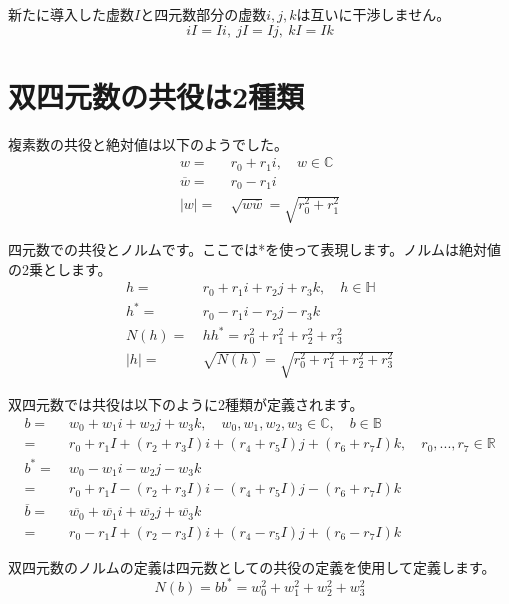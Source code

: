 \documentclass[a4paper,12pt,notitlepage]{jsreport}
\begin{document}
新たに導入した虚数$I$と四元数部分の虚数$i, j, k$は互いに干渉しません。
\begin{equation}
iI=Ii,~jI=Ij,~kI=Ik
\end{equation}

\section{双四元数の共役は2種類}

複素数の共役と絶対値は以下のようでした。
\begin{equation}
\begin{split}
w=~&r_0+r_1i,\quad w\in\mathbb{C}\\
\overline{w}=~&r_0-r_1i\\
|w|=~&\sqrt{w\overline{w}}=\sqrt{r_0^2+r_1^2}
\end{split}
\end{equation}

四元数での共役とノルムです。ここでは*を使って表現します。ノルムは絶対値の2乗とします。
\begin{equation}
\begin{split}
h=~&r_0+r_1i+r_2j+r_3k,\quad h\in\mathbb{H}\\
h^*=~&r_0-r_1i-r_2j-r_3k\\
N(h)=~&hh^*=r_0^2+r_1^2+r_2^2+r_3^2\\
|h|=~&\sqrt{N(h)}=\sqrt{r_0^2+r_1^2+r_2^2+r_3^2}
\end{split}
\end{equation}

双四元数では共役は以下のように2種類が定義されます。
\begin{equation}
\begin{split}
b=~&w_0+w_1i+w_2j+w_3k,\quad w_0,w_1,w_2,w_3\in\mathbb{C},\quad b\in\mathbb{B}\\
=~&r_0+r_1I+(r_2+r_3I)i+(r_4+r_5I)j+(r_6+r_7I)k,\quad r_0,...,r_7\in\mathbb{R}\\
b^*=~&w_0-w_1i-w_2j-w_3k\\
=~&r_0+r_1I-(r_2+r_3I)i-(r_4+r_5I)j-(r_6+r_7I)k\\
\overline{b}=~&\overline{w_0}+\overline{w_1}i+\overline{w_2}j+\overline{w_3}k\\
=~&r_0-r_1I+(r_2-r_3I)i+(r_4-r_5I)j+(r_6-r_7I)k
\end{split}
\end{equation}

双四元数のノルムの定義は四元数としての共役の定義を使用して定義します。
\begin{equation}
N(b)=bb^*=w_0^2+w_1^2+w_2^2+w_3^2
\end{equation}
\end{document}
